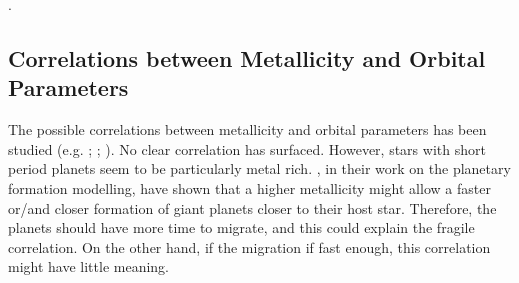 \documentclass[dvips,12pt,a4paper]{report}
\begin{document}
{. %



\subsection {Correlations between Metallicity and Orbital Parameters}

The possible correlations between metallicity and orbital parameters has been studied (e.g. \citeauthor{Gonzalez-1998} \citeyear{Gonzalez-1998}; \citeauthor{Santos-2003} \citeyear{Santos-2003}; \citeauthor {Fischer-2005} \citeyear {Fischer-2005}). No clear correlation has surfaced. However, stars with short period planets seem to be particularly metal rich. \citet{Ida-2004b}, in their work on the planetary formation modelling, have shown that a higher metallicity might allow a faster or/and closer formation of giant planets closer to their host star. Therefore, the planets should have more time to migrate, and this could explain the fragile correlation.  On the other hand, if the migration if fast enough, this correlation might have little meaning. %

}
\end{document}
